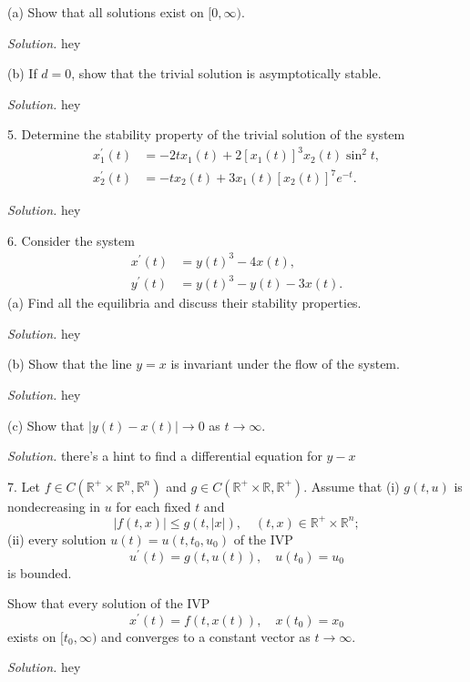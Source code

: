 \documentclass{article}
\newcommand{\R}{\mathbb{R}}
\begin{document}
(a) Show that all solutions exist on $[0, \infty)$.

\textit{Solution.}
hey

\vspace{5mm}

(b) If $d = 0$, show that the trivial solution is asymptotically stable.

\textit{Solution.}
hey

\newpage

5. Determine the stability property of the trivial solution of the system
%
\begin{align*}
    x_1^\prime(t) &= -2t x_1(t) + 2 [x_1(t)]^3 x_2(t) \sin^2 t, \\
    x_2^\prime(t) &= -t x_2(t) + 3 x_1(t) [x_2(t)]^7 e^{-t}.
\end{align*}

\textit{Solution.}
hey

\newpage

6. Consider the system
%
\begin{align*}
    x^\prime(t) &= y(t)^3 - 4 x(t), \\
    y^\prime(t) &= y(t)^3 - y(t) - 3 x(t).
\end{align*}
%
(a) Find all the equilibria and discuss their stability properties.

\textit{Solution.}
hey

\vspace{5mm}

(b) Show that the line $y = x$ is invariant under the flow of the system.

\textit{Solution.}
hey

\vspace{5mm}

(c) Show that $|y(t) - x(t)| \to 0$ as $t \to \infty$.

\textit{Solution.}
there's a hint to find a differential equation for $y - x$

\newpage

7. Let $f \in C(\R^+ \times \R^n, \R^n)$ and $g \in C(\R^+ \times \R, \R^+)$.
Assume that (i) $g(t, u)$ is nondecreasing in $u$ for each fixed $t$ and
%
\begin{equation*}
    |f(t, x)| \leq g(t, |x|), \quad (t, x) \in \R^+ \times \R^n;
\end{equation*}
%
(ii) every solution $u(t) = u(t, t_0, u_0)$ of the IVP
%
\begin{equation*}
    u^\prime(t) = g(t, u(t)), \quad u(t_0) = u_0
\end{equation*}
%
is bounded.

Show that every solution of the IVP
%
\begin{equation*}
    x^\prime(t) = f(t, x(t)), \quad x(t_0) = x_0
\end{equation*}
%
exists on $[t_0, \infty)$ and converges to a constant vector as $t \to \infty$.

\textit{Solution.}
hey
\end{document}
